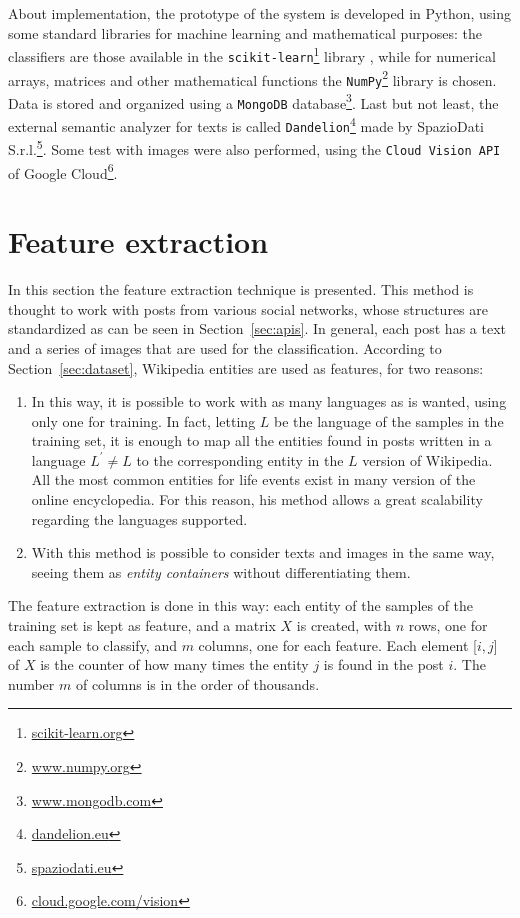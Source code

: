 About implementation, the prototype of the system is developed in Python, using some standard libraries for machine learning and mathematical purposes: the classifiers are those available in the \texttt{scikit-learn}\footnote{\url{scikit-learn.org}} library \cite{scikit-learn}, while for numerical arrays, matrices and other mathematical functions the \texttt{NumPy}\footnote{\url{www.numpy.org}} library \cite{oliphant2006guide} is chosen. Data is stored and organized using a \texttt{MongoDB} database\footnote{\url{www.mongodb.com}}. Last but not least, the external semantic analyzer for texts is called \texttt{Dandelion}\footnote{\url{dandelion.eu}} made by SpazioDati S.r.l.\footnote{\url{spaziodati.eu}}. Some test with images were also performed, using the \texttt{Cloud Vision API} of Google Cloud\footnote{\url{cloud.google.com/vision}}.

\section{Feature extraction}
\label{sec:featurextraction}
In this section the feature extraction technique is presented. This method is thought to work with posts from various social networks, whose structures are standardized as can be seen in Section~\ref{sec:apis}. In general, each post has a text and a series of images that are used for the classification. According to Section~\ref{sec:dataset}, Wikipedia entities are used as features, for two reasons:
\begin{enumerate}
\item In this way, it is possible to work with as many languages as is wanted, using only one for training. In fact, letting $ L $ be the language of the samples in the training set, it is enough to map all the entities found in posts written in a language $ L^{'} \ne L $ to the corresponding entity in the $ L $ version of Wikipedia. All the most common entities for life events exist in many version of the online encyclopedia. For this reason, his method allows a great scalability regarding the languages supported.
\item With this method is possible to consider texts and images in the same way, seeing them as \emph{entity containers} without differentiating them.
\end{enumerate}

The feature extraction is done in this way: each entity of the samples of the training set is kept as feature, and a matrix $X$ is created, with $n$ rows, one for each sample to classify, and $m$ columns, one for each feature. Each element [$i,j$] of $X$ is the counter of how many times the entity $j$ is found in the post $i$. The number $m$ of columns is in the order of thousands.

